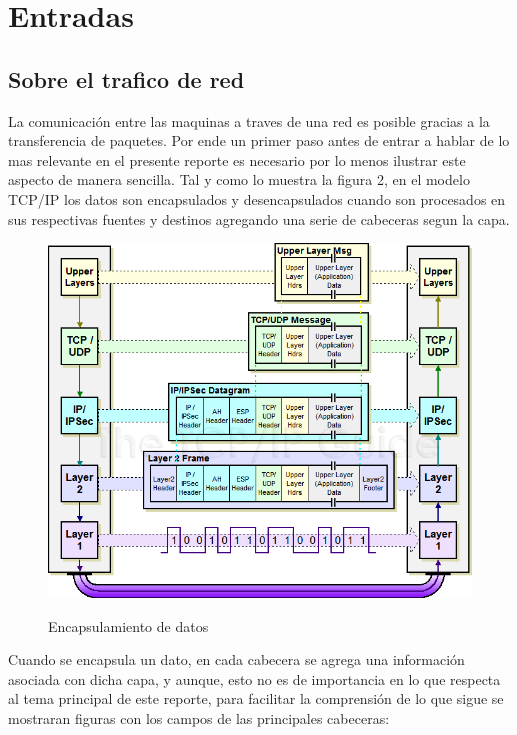 \documentclass[12pt]{article}
\begin{document}
\section{Entradas}

\subsection{Sobre el trafico de red}

La comunicación entre las maquinas a traves de una red es posible gracias a la transferencia de paquetes. Por ende un primer paso antes de entrar a hablar de lo mas relevante en el presente reporte es necesario por lo menos ilustrar este aspecto de manera sencilla. Tal y como lo muestra la figura 2, en el modelo TCP/IP los datos son encapsulados y desencapsulados cuando son procesados en sus respectivas fuentes y destinos agregando una serie de cabeceras segun la capa. 

\begin{figure}[htbp]
\begin{center}
\includegraphics[scale=0.3]{modelo_TCP_IP2.png}\\[1cm] %
\caption{Encapsulamiento de datos}
\end{center}
\end{figure}

Cuando se encapsula un dato, en cada cabecera se agrega una información asociada con dicha capa, y aunque, esto no es de importancia en lo que respecta al tema principal de este reporte, para facilitar la comprensión de lo que sigue se mostraran figuras con los campos de las principales cabeceras:
\end{document}
